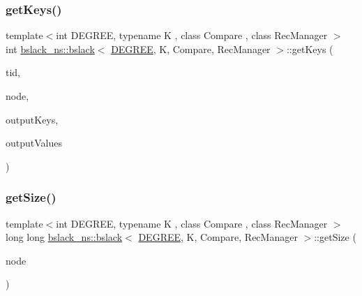 \subsubsection{\texorpdfstring{get\+Keys()}{getKeys()}}
{\footnotesize\ttfamily template$<$int D\+E\+G\+R\+EE, typename K , class Compare , class Rec\+Manager $>$ \\
int \hyperlink{classbslack__ns_1_1bslack}{bslack\+\_\+ns\+::bslack}$<$ \hyperlink{brown__sigouin__abtree__kcas_2adapter_8h_a5d88b17d70c985f2f2b8e987037fd6dd}{D\+E\+G\+R\+EE}, K, Compare, Rec\+Manager $>$\+::get\+Keys (\begin{DoxyParamCaption}\item[{const int}]{tid,  }\item[{\hyperlink{structbslack__ns_1_1Node}{Node}$<$ \hyperlink{brown__sigouin__abtree__kcas_2adapter_8h_a5d88b17d70c985f2f2b8e987037fd6dd}{D\+E\+G\+R\+EE}, K $>$ $\ast$}]{node,  }\item[{K $\ast$const}]{output\+Keys,  }\item[{void $\ast$$\ast$const}]{output\+Values }\end{DoxyParamCaption})\hspace{0.3cm}{\ttfamily [inline]}}

\mbox{\label{classbslack__ns_1_1bslack_a3878b7dd717d5960c94c31668b1c2f4d}} 
\subsubsection{\texorpdfstring{get\+Size()}{getSize()}\hspace{0.1cm}{\footnotesize\ttfamily [1/2]}}
{\footnotesize\ttfamily template$<$int D\+E\+G\+R\+EE, typename K , class Compare , class Rec\+Manager $>$ \\
long long \hyperlink{classbslack__ns_1_1bslack}{bslack\+\_\+ns\+::bslack}$<$ \hyperlink{brown__sigouin__abtree__kcas_2adapter_8h_a5d88b17d70c985f2f2b8e987037fd6dd}{D\+E\+G\+R\+EE}, K, Compare, Rec\+Manager $>$\+::get\+Size (\begin{DoxyParamCaption}\item[{\hyperlink{structbslack__ns_1_1Node}{Node}$<$ \hyperlink{brown__sigouin__abtree__kcas_2adapter_8h_a5d88b17d70c985f2f2b8e987037fd6dd}{D\+E\+G\+R\+EE}, K $>$ $\ast$}]{node }\end{DoxyParamCaption})\hspace{0.3cm}{\ttfamily [inline]}}

